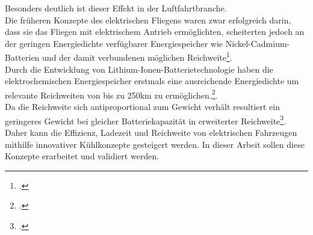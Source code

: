 Besonders deutlich ist dieser Effekt in der Luftfahrtbranche. \\
Die früheren Konzepte des elektrischen Fliegens waren zwar erfolgreich darin, dass sie das Fliegen mit elektrischem Antrieb ermöglichten, scheiterten jedoch an der geringen Energiedichte verfügbarer Energiespeicher wie Nickel-Cadmium-Batterien und der damit verbundenen möglichen Reichweite\footcite[Vgl.][S. 4]{Hepperle2012}.\\
Durch die Entwicklung von Lithium-Ionen-Batterietechnologie haben die elektrochemischen Energiespeicher erstmals eine ausreichende Energiedichte um relevante Reichweiten von bis zu 250km zu ermöglichen.\footcite[Vgl.][]{Lilium}.\\
Da die Reichweite sich antiproportional zum Gewicht verhält resultiert ein geringeres Gewicht bei gleicher Batteriekapazität in erweiterter Reichweite\footcite[Vgl.][S. 705]{Traub2011}.\\
Daher kann die Effizienz, Ladezeit und Reichweite von elektrischen Fahrzeugen mithilfe innovativer Kühlkonzepte gesteigert werden. In dieser Arbeit sollen diese Konzepte erarbeitet und validiert werden.\\

















